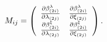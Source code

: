 \begin{equation}
M_{ij}=
\left(
\begin{array}{c c}
{\partial\beta^\lambda_{(2i)}\over\partial\lambda_{(2j)}}&
{\partial\beta^\lambda_{(2i)}\over\partial\xi_{(2j)}}\\
{\partial\beta^\xi_{(2i)}\over\partial\lambda_{(2j)}}&
{\partial\beta^\xi_{(2i)}\over\partial\xi_{(2j)}}
\end{array}
\right).
\end{equation}

